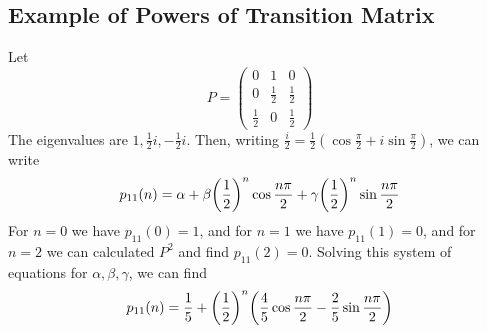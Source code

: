 \subsection{Example of Powers of Transition Matrix}
\begin{example}
	Let
	\[
		P = \begin{pmatrix}
			0           & 1           & 0           \\
			0           & \frac{1}{2} & \frac{1}{2} \\
			\frac{1}{2} & 0           & \frac{1}{2}
		\end{pmatrix}
	\]
	The eigenvalues are \( 1, \frac{1}{2}i, -\frac{1}{2}i \).
	Then, writing \( \frac{i}{2} = \frac{1}{2} (\cos \frac{\pi}{2} + i \sin \frac{\pi}{2} ) \), we can write
	\[
		p_{11}(n) = \alpha + \beta \qty(\frac{1}{2})^n \cos \frac{n \pi}{2} + \gamma \qty(\frac{1}{2})^n \sin \frac{n \pi}{2}
	\]
	For \( n = 0 \) we have \( p_{11}(0) = 1 \), and for \( n = 1 \) we have \( p_{11}(1) = 0 \), and for \( n = 2 \) we can calculated \( P^2 \) and find \( p_{11}(2) = 0 \).
	Solving this system of equations for \( \alpha, \beta, \gamma \), we can find
	\[
		p_{11}(n) = \frac{1}{5} + \qty(\frac{1}{2})^n \qty(\frac{4}{5}\cos \frac{n \pi}{2} - \frac{2}{5}\sin \frac{n \pi}{2} )
	\]
\end{example}

